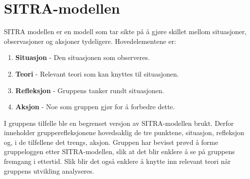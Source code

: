 \section{SITRA-modellen}
SITRA modellen er en modell som tar sikte på å gjøre skillet mellom situasjoner, observasjoner og aksjoner tydeligere.
Hovedelementene er:

\begin{enumerate}
  \item \textbf{Situasjon} - Den situasjonen som observeres.
  \item \textbf{Teori} - Relevant teori som kan knyttes til situasjonen.
  \item \textbf{Refleksjon} - Gruppens tanker rundt situasjonen.
  \item \textbf{Aksjon} - Noe som gruppen gjør for å forbedre dette. 
\end{enumerate}

I gruppens tilfelle ble en begrenset versjon av SITRA-modellen brukt. 
Derfor inneholder grupperefleksjonene hovedsaklig de tre punktene, situasjon, refleksjon og, i de tilfellene det trengs, aksjon.
Gruppen har bevisst prøvd å forme gruppeloggen etter SITRA-modellen, slik at det blir enklere å se på gruppens fremgang i ettertid. 
Slik blir det også enklere å knytte inn relevant teori når gruppens utvikling analyseres. 
